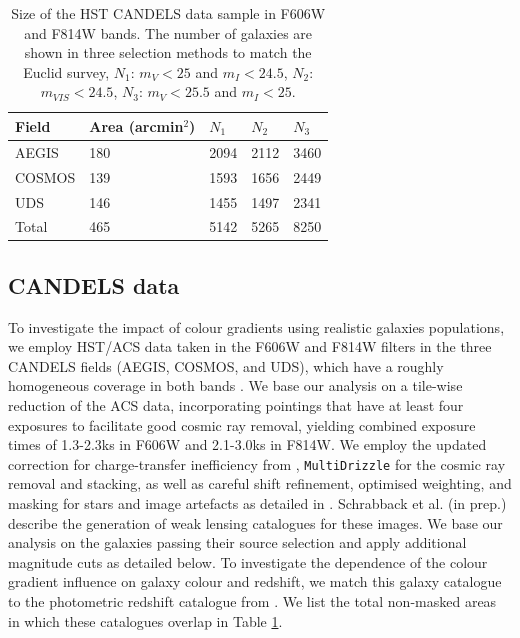 \documentclass[useAMS,usenatbib]{mnras}
\begin{document}
\begin{center}
\begin{table}
  \begin{tabular}{lllll}
    \hline
    Field   &Area (arcmin$^2$) &$N_1$ &$N_2$ &$N_3$\\
    \hline
    AEGIS   &180   &2094  &2112  &3460\\
    COSMOS  &139   &1593  &1656  &2449\\
    UDS     &146   &1455  &1497  &2341\\
    Total   &465   &5142  &5265  &8250\\
    \hline
  \end{tabular}
  \caption{\label{table:mag} Size of the HST CANDELS data sample in F606W
    and F814W bands.  The number of galaxies are shown in three selection
    methods to match the Euclid survey, $N_1$: $m_V<25$ and $m_I<24.5$,
    $N_2$: $m_{VIS}<24.5$, $N_3$: $m_V<25.5$ and $m_I<25$. }
\end{table}
\end{center}
%

\subsection{CANDELS data}

To investigate the impact of colour gradients using realistic galaxies
populations, we employ HST/ACS data taken in the F606W and F814W
filters in the three CANDELS fields (AEGIS, COSMOS, and UDS), which have
a roughly homogeneous coverage in both bands
\citep[see][]{davis2007,grogin2011,koekemoer11}. We base our analysis
on a tile-wise reduction of the ACS data, incorporating pointings
that have at least four exposures to facilitate good cosmic ray
removal, yielding combined exposure times of 1.3-2.3ks in F606W and
2.1-3.0ks in F814W.  We employ the updated correction for
charge-transfer inefficiency from \cite{massey2014},
\texttt{MultiDrizzle} \citep{koekemoer2003} for the cosmic ray removal
and stacking, as well as careful shift refinement, optimised
weighting, and masking for stars and image artefacts as detailed in
\cite{schrabback2010}.  Schrabback et al. (in prep.) describe the
generation of weak lensing catalogues for these images.  We base our
analysis on the galaxies passing their source selection and apply
additional magnitude cuts as detailed below. To investigate the
dependence of the colour gradient influence on galaxy colour and
redshift, we match this galaxy catalogue to the photometric redshift
catalogue from \cite{skelton14}.  We list the total non-masked areas
in which these catalogues overlap in Table \ref{table:mag}.
\end{document}
